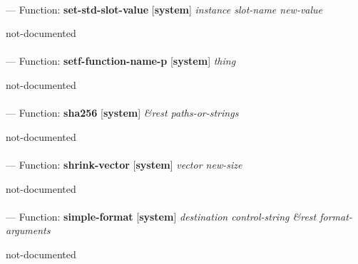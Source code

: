 \paragraph{}
\label{SYSTEM:SET-STD-SLOT-VALUE}
--- Function: \textbf{set-std-slot-value} [\textbf{system}] \textit{instance slot-name new-value}

\begin{adjustwidth}{5em}{5em}
not-documented
\end{adjustwidth}

\paragraph{}
\label{SYSTEM:SETF-FUNCTION-NAME-P}
--- Function: \textbf{setf-function-name-p} [\textbf{system}] \textit{thing}

\begin{adjustwidth}{5em}{5em}
not-documented
\end{adjustwidth}

\paragraph{}
\label{SYSTEM:SHA256}
--- Function: \textbf{sha256} [\textbf{system}] \textit{\&rest paths-or-strings}

\begin{adjustwidth}{5em}{5em}
not-documented
\end{adjustwidth}

\paragraph{}
\label{SYSTEM:SHRINK-VECTOR}
--- Function: \textbf{shrink-vector} [\textbf{system}] \textit{vector new-size}

\begin{adjustwidth}{5em}{5em}
not-documented
\end{adjustwidth}

\paragraph{}
\label{SYSTEM:SIMPLE-FORMAT}
--- Function: \textbf{simple-format} [\textbf{system}] \textit{destination control-string \&rest format-arguments}

\begin{adjustwidth}{5em}{5em}
not-documented
\end{adjustwidth}


